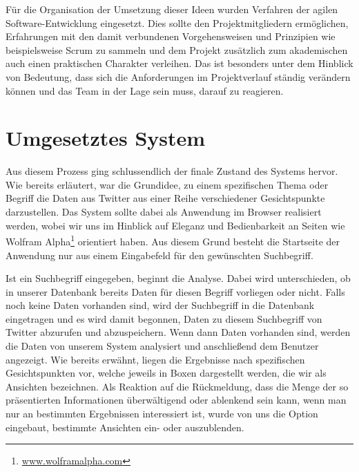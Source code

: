 Für die Organisation der Umsetzung dieser Ideen wurden Verfahren der agilen Software-Entwicklung eingesetzt. 
Dies sollte den Projektmitgliedern ermöglichen, Erfahrungen mit den damit verbundenen Vorgehensweisen und Prinzipien wie beispielsweise Scrum zu sammeln und dem Projekt zusätzlich zum akademischen auch einen praktischen Charakter verleihen. 
Das ist besonders unter dem Hinblick von Bedeutung, dass sich die Anforderungen im Projektverlauf ständig verändern können und das Team in der Lage sein muss, darauf zu reagieren.

\section{Umgesetztes System}
\label{sec:umgesetztesSystem}

Aus diesem Prozess ging schlussendlich der finale Zustand des Systems hervor. Wie bereits erläutert, war die Grundidee, zu einem spezifischen Thema oder Begriff die Daten aus Twitter aus einer Reihe verschiedener Gesichtspunkte darzustellen. Das System sollte dabei als Anwendung im Browser realisiert werden, wobei wir uns im Hinblick auf Eleganz und Bedienbarkeit an Seiten wie Wolfram Alpha\footnote{\url{www.wolframalpha.com}} orientiert haben. Aus diesem Grund besteht die Startseite der Anwendung nur aus einem Eingabefeld für den gewünschten Suchbegriff.

Ist ein Suchbegriff eingegeben, beginnt die Analyse. Dabei wird unterschieden, ob in unserer Datenbank bereits Daten für diesen Begriff vorliegen oder nicht. Falls noch keine Daten vorhanden sind, wird der Suchbegriff in die Datenbank eingetragen und es wird damit begonnen, Daten zu diesem Suchbegriff von Twitter abzurufen und abzuspeichern. Wenn dann Daten vorhanden sind, werden die Daten von unserem System analysiert und anschließend dem Benutzer angezeigt. Wie bereits erwähnt, liegen die Ergebnisse nach spezifischen Gesichtspunkten vor, welche jeweils in Boxen dargestellt werden, die wir als Ansichten bezeichnen. Als Reaktion auf die Rückmeldung, dass die Menge der so präsentierten Informationen überwältigend oder ablenkend sein kann, wenn man nur an bestimmten Ergebnissen interessiert ist, wurde von uns die Option eingebaut, bestimmte Ansichten ein- oder auszublenden.

